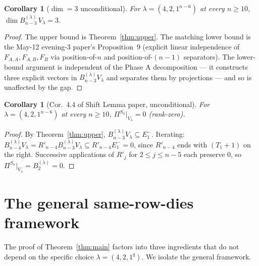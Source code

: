 \documentclass[11pt]{article}
\newtheorem{corollary}[theorem]{Corollary}
\theoremstyle{definition}
\begin{document}
\begin{corollary}[$\dim = 3$ unconditional]\label{cor:dim-3}
For $\lambda = (4, 2, 1^{n-6})$ at every $n \ge 10$,
$\dim B^{(\lambda)}_{n-3}\,V_\lambda = 3$.
\end{corollary}

\begin{proof}
The upper bound is Theorem~\ref{thm:upper}. The matching lower bound
is the May-12 evening-3 paper's Proposition~9 (explicit linear
independence of $F_{A,A}, F_{A,B}, F_B$ via position-of-$n$ and
position-of-$(n-1)$ separators). The lower-bound argument is
independent of the Phase A decomposition --- it constructs three
explicit vectors in $B^{(\lambda)}_{n-3} V_\lambda$ and separates
them by projections --- and so is unaffected by the gap.
\end{proof}

\begin{corollary}[Cor.~4.4 of Shift Lemma paper, unconditional]\label{cor:rank-zero}
For $\lambda = (4, 2, 1^{n-6})$ at every $n \ge 10$,
$\Pi^{S_n}|_{V_\lambda} = 0$ (rank-zero).
\end{corollary}

\begin{proof}
By Theorem~\ref{thm:upper}, $B^{(\lambda)}_{n-3} V_\lambda \subseteq
E_1^-$. Iterating: $B^{(\lambda)}_{n-4} V_\lambda
= R'_{n-4} B^{(\lambda)}_{n-3} V_\lambda \subseteq R'_{n-4} E_1^- = 0$,
since $R'_{n-4}$ ends with $(T_1+1)$ on the right.
Successive applications of $R'_j$ for $2 \le j \le n - 5$ each preserve
$0$, so $\Pi^{S_n}|_{V_\lambda} = B^{(\lambda)}_2 = 0$.
\end{proof}

\section{The general same-row-dies framework}\label{sec:framework}

The proof of Theorem~\ref{thm:main} factors into three ingredients
that do not depend on the specific choice $\lambda = (4, 2, 1^q)$.
We isolate the general framework.
\end{document}
